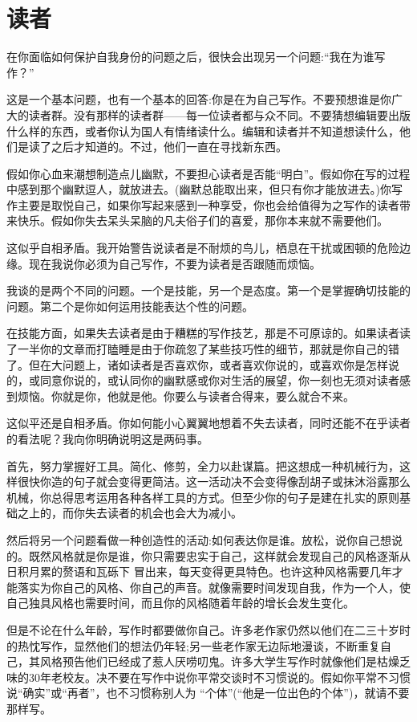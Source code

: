 \chapter{读者}
在你面临如何保护自我身份的问题之后，很快会出现另一个问题:“我在为谁写作？”

这是一个基本问题，也有一个基本的回答:你是在为自己写作。不要预想谁是你广大的读者群。没有那样的读者群——每一位读者都与众不同。不要猜想编辑要出版什么样的东西，或者你认为国人有情绪读什么。编辑和读者并不知道想读什么，他们是读了之后才知道的。不过，他们一直在寻找新东西。

假如你心血来潮想制造点儿幽默，不要担心读者是否能“明白”。假如你在写的过程中感到那个幽默逗人，就放进去。(幽默总能取出来，但只有你才能放进去。)你写作主要是取悦自己，如果你写起来感到一种享受，你也会给值得为之写作的读者带来快乐。假如你失去呆头呆脑的凡夫俗子们的喜爱，那你本来就不需要他们。

这似乎自相矛盾。我开始警告说读者是不耐烦的鸟儿，栖息在干扰或困顿的危险边缘。现在我说你必须为自己写作，不要为读者是否跟随而烦恼。

我谈的是两个不同的问题。一个是技能，另一个是态度。第一个是掌握确切技能的问题。第二个是你如何运用技能表达个性的问题。

在技能方面，如果失去读者是由于糟糕的写作技艺，那是不可原谅的。如果读者读了一半你的文章而打瞌睡是由于你疏忽了某些技巧性的细节，那就是你自己的错了。但在大问题上，诸如读者是否喜欢你，或者喜欢你说的，或喜欢你是怎样说的，或同意你说的，或认同你的幽默感或你对生活的展望，你一刻也无须对读者感到烦恼。你就是你，他就是他。你要么与读者合得来，要么就合不来。

这似平还是自相矛盾。你如何能小心翼翼地想着不失去读者，同时还能不在乎读者的看法呢？我向你明确说明这是两码事。

首先，努力掌握好工具。简化、修剪，全力以赴谋篇。把这想成一种机械行为，这样很快你造的句子就会变得更简洁。这一活动决不会变得像刮胡子或抹沐浴露那么机械，你总得思考运用各种各样工具的方式。但至少你的句子是建在扎实的原则基础之上的，而你失去读者的机会也会大为减小。

然后将另一个问题看做一种创造性的活动:如何表达你是谁。放松，说你自己想说的。既然风格就是你是谁，你只需要忠实于自己，这样就会发现自己的风格逐渐从日积月累的赘语和瓦砾下 冒出来，每天变得更具特色。也许这种风格需要几年才能落实为你自己的风格、你自己的声音。就像需要时间发现自我，作为一个人，使自己独具风格也需要时间，而且你的风格随着年龄的增长会发生变化。

但是不论在什么年龄，写作时都要做你自己。许多老作家仍然以他们在二三十岁时的热忱写作，显然他们的想法仍年轻;另一些老作家无边际地漫谈，不断重复自己，其风格预告他们已经成了惹人厌唠叨鬼。许多大学生写作时就像他们是枯燥乏味的30年老校友。决不要在写作中说你平常交谈时不习惯说的。假如你平常不习惯说“确实”或“再者”，也不习惯称别人为 “个体”(“他是一位出色的个体”)，就请不要那样写。

